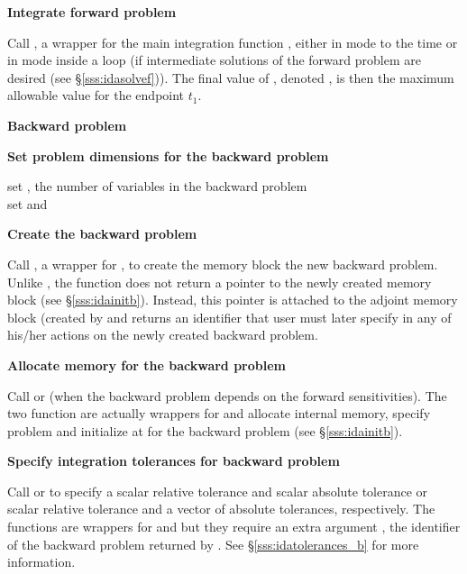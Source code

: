 \begin{Steps}
\item
  {\bf Integrate forward problem}

  Call , a wrapper for the {\idas} main integration
  function , either in  mode to the time 
   or in  mode inside a loop (if intermediate
  solutions of the forward problem are desired (see \S\ref{sss:idasolvef})).
  The final value of , denoted , is then
  the maximum allowable value for the endpoint $t_1$.

  \vspace{0.2in}\centerline{\bf Backward problem}

 \item \label{i:back_start}
   {\bf Set problem dimensions for the backward problem}
   
   {\s} set , the number of variables in the backward problem \\
   {\p} set  and 

\item
  {\bf Create the backward problem}

  Call , a wrapper for , to
  create the {\idas} memory block the new backward problem. Unlike , 
  the function  does not return a pointer to the newly created 
  memory block (see \S\ref{sss:idainitb}). Instead, this pointer is attached to 
  the adjoint memory  block (created by  and returns an identifier 
  that user must later specify in any of his/her actions on the newly created 
  backward problem.

\item
  {\bf Allocate memory for the backward problem}

  Call  or  (when the backward problem depends on the
  forward sensitivities). The two function are actually wrappers for  
  and allocate internal memory, specify problem and initialize {\idas} 
  at  for the backward problem (see \S\ref{sss:idainitb}).

\item 
  {\bf Specify integration tolerances for backward problem}
  
  Call  or 
  to specify a scalar relative tolerance and scalar absolute tolerance or
  scalar relative tolerance and a vector of absolute tolerances, respectively.
  The functions are wrappers for  and
   but they require an extra argument ,
  the identifier of the backward problem returned by .
  See \S\ref{sss:idatolerances_b} for more information.



\end{Steps}
